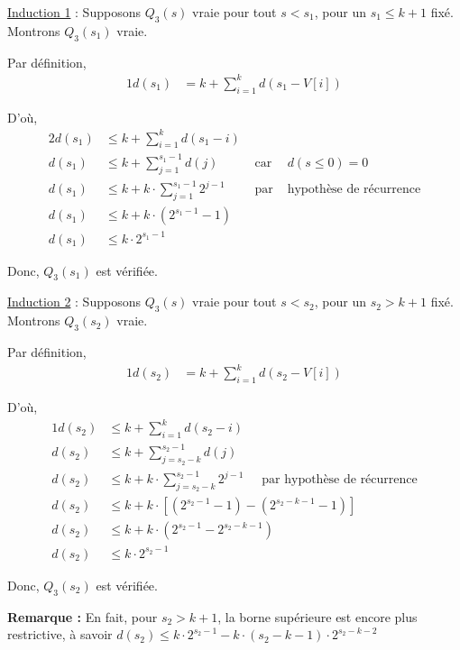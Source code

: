 \documentclass[12pt,a4paper]{article}
\begin{document}
\begin{appendices}
\medskip
\underline{Induction 1} : Supposons \( Q_{3}(s) \) vraie pour tout \( s < s_1 \), pour un $s_1 \leq k+1$ fix\'e. Montrons \( Q_{3}(s_1) \) vraie.

Par d\'efinition,
\begin{alignat*}{1}
    d(s_1) &= k + \displaystyle\sum_{i = 1}^{k} d(s_1 - V[i])
\end{alignat*}

D'o\`u,
\begin{alignat*}{2}
    d(s_1) &\leq k + \displaystyle\sum_{i = 1}^{k} d(s_1 - i) \\
    d(s_1) &\leq k + \displaystyle\sum_{j = 1}^{s_1 - 1} d(j) & \text{ car }& d(s \leq 0) = 0 \\
    d(s_1) &\leq k + k \cdot \displaystyle\sum_{j = 1}^{s_1 - 1} 2^{j-1} & \text{ par }& \text{hypoth\`ese de r\'ecurrence} \\
    d(s_1) &\leq k + k \cdot (2^{s_1-1}-1) \\
    d(s_1) &\leq k \cdot 2^{s_1-1}
\end{alignat*}

Donc, \( Q_{3}(s_1) \) est v\'erifi\'ee.

\medskip
\underline{Induction 2} : Supposons \( Q_{3}(s) \) vraie pour tout \( s < s_2 \), pour un $s_2 > k+1$ fix\'e. Montrons \( Q_{3}(s_2) \) vraie.

Par d\'efinition,
\begin{alignat*}{1}
    d(s_2) &= k + \displaystyle\sum_{i = 1}^{k} d(s_2 - V[i])
\end{alignat*}

D'o\`u,
\begin{alignat*}{1}
    d(s_2) &\leq k + \displaystyle\sum_{i = 1}^{k} d(s_2 - i) \\
    d(s_2) &\leq k + \displaystyle\sum_{j = s_2 - k}^{s_2 - 1} d(j) \\
    d(s_2) &\leq k + k \cdot \displaystyle\sum_{j = s_2 - k}^{s_2 - 1} 2^{j-1} \phantom{ttt} \text{ par hypoth\`ese de r\'ecurrence} \\
    d(s_2) &\leq k + k \cdot \left[ (2^{s_2-1}-1) - (2^{s_2-k-1}-1) \right] \\
    d(s_2) &\leq k + k \cdot (2^{s_2-1} - 2^{s_2-k- 1}) \\
    d(s_2) &\leq k \cdot 2^{s_2-1}
\end{alignat*}

Donc, \( Q_{3}(s_2) \) est v\'erifi\'ee.

\medskip
\begin{tcolorbox}
{\bfseries Remarque :} En fait, pour $s_2 > k+1 $, la borne sup\'erieure est encore plus restrictive, \`a savoir $d(s_2) \leq k \cdot 2^{s_2 - 1} - k \cdot (s_2-k-1) \cdot 2^{s_2-k-2}$


\end{tcolorbox}
\end{appendices}
\end{document}
